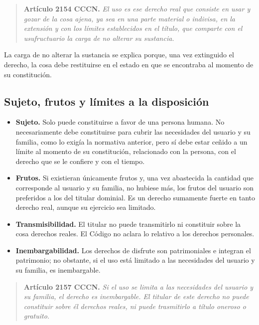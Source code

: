 \documentclass[12pt,oneside]{book}
\begin{document}
\begin{quote}
\textbf{Artículo 2154 CCCN.} \textit{El uso es ese derecho real que consiste en usar y gozar de la cosa ajena, ya sea en una parte material o indivisa, en la extensión y con los límites establecidos en el título, que comparte con el usufructuario la carga de no alterar su sustancia.}
\end{quote}

La carga de no alterar la sustancia se explica porque, una vez extinguido el derecho, la cosa debe restituirse en el estado en que se encontraba al momento de su constitución.

\subsection{Sujeto, frutos y límites a la disposición}

\begin{itemize}
    \item \textbf{Sujeto.} Solo puede constituirse a favor de una persona humana. No necesariamente debe constituirse para cubrir las necesidades del usuario y su familia, como lo exigía la normativa anterior, pero sí debe estar ceñido a un límite al momento de su constitución, relacionado con la persona, con el derecho que se le confiere y con el tiempo.
    \item \textbf{Frutos.} Si existieran únicamente frutos y, una vez abastecida la cantidad que corresponde al usuario y su familia, no hubiese más, los frutos del usuario son preferidos a los del titular dominial. Es un derecho sumamente fuerte en tanto derecho real, aunque su ejercicio sea limitado.
    \item \textbf{Transmisibilidad.} El titular no puede transmitirlo ni constituir sobre la cosa derechos reales. El Código no aclara lo relativo a los derechos personales.
    \item \textbf{Inembargabilidad.} Los derechos de disfrute son patrimoniales e integran el patrimonio; no obstante, si el uso está limitado a las necesidades del usuario y su familia, es inembargable.
\end{itemize}

\begin{quote}
\textbf{Artículo 2157 CCCN.} \textit{Si el uso se limita a las necesidades del usuario y su familia, el derecho es inembargable. El titular de este derecho no puede constituir sobre él derechos reales, ni puede trasmitirlo a título oneroso o gratuito.}
\end{quote}
\end{document}
